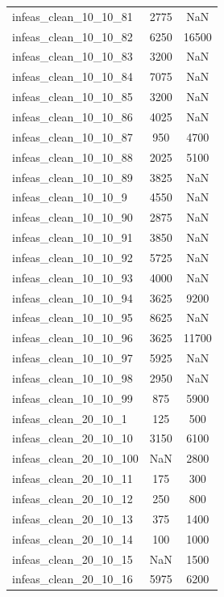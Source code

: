 \begin{longtable}{lcc}
infeas\_clean\_10\_10\_81  &     2775 &    NaN \\
infeas\_clean\_10\_10\_82  &     6250 &  16500 \\
infeas\_clean\_10\_10\_83  &     3200 &    NaN \\
infeas\_clean\_10\_10\_84  &     7075 &    NaN \\
infeas\_clean\_10\_10\_85  &     3200 &    NaN \\
infeas\_clean\_10\_10\_86  &     4025 &    NaN \\
infeas\_clean\_10\_10\_87  &      950 &   4700 \\
infeas\_clean\_10\_10\_88  &     2025 &   5100 \\
infeas\_clean\_10\_10\_89  &     3825 &    NaN \\
infeas\_clean\_10\_10\_9   &     4550 &    NaN \\
infeas\_clean\_10\_10\_90  &     2875 &    NaN \\
infeas\_clean\_10\_10\_91  &     3850 &    NaN \\
infeas\_clean\_10\_10\_92  &     5725 &    NaN \\
infeas\_clean\_10\_10\_93  &     4000 &    NaN \\
infeas\_clean\_10\_10\_94  &     3625 &   9200 \\
infeas\_clean\_10\_10\_95  &     8625 &    NaN \\
infeas\_clean\_10\_10\_96  &     3625 &  11700 \\
infeas\_clean\_10\_10\_97  &     5925 &    NaN \\
infeas\_clean\_10\_10\_98  &     2950 &    NaN \\
infeas\_clean\_10\_10\_99  &      875 &   5900 \\
infeas\_clean\_20\_10\_1   &      125 &    500 \\
infeas\_clean\_20\_10\_10  &     3150 &   6100 \\
infeas\_clean\_20\_10\_100 &      NaN &   2800 \\
infeas\_clean\_20\_10\_11  &      175 &    300 \\
infeas\_clean\_20\_10\_12  &      250 &    800 \\
infeas\_clean\_20\_10\_13  &      375 &   1400 \\
infeas\_clean\_20\_10\_14  &      100 &   1000 \\
infeas\_clean\_20\_10\_15  &      NaN &   1500 \\
infeas\_clean\_20\_10\_16  &     5975 &   6200 \\

\end{longtable}

